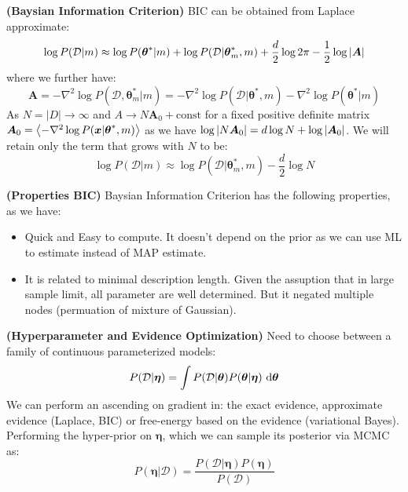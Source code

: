 \begin{definition}{\textbf{(Baysian Information Criterion)}}
    BIC can be obtained from Laplace approximate:
    \begin{equation*}
        \log P(\mathcal{D} | m) \approx \log P(\boldsymbol \theta^* | m) + \log P(\mathcal{D}|\boldsymbol \theta^*_m, m) + \frac{d}{2}\log 2\pi - \frac{1}{2}\log\left| \boldsymbol A \right|
    \end{equation*}
    where we further have:
    \begin{equation*}
        \boldsymbol A = -\nabla^2\log P(\mathcal{D}, \boldsymbol \theta^*_m | m) = -\nabla^2\log P(\mathcal{D}|\boldsymbol \theta^*, m) -\nabla^2\log P(\boldsymbol \theta^*|m)
    \end{equation*}
    As $N=|D|\rightarrow\infty$ and $A\rightarrow N\boldsymbol A_0 + \text{const}$ for a fixed positive definite matrix $\boldsymbol A_0 = \left\langle -\nabla^2\log P(\boldsymbol x | \boldsymbol \theta^*, m) \right\rangle$ as we have $\log\left| N\boldsymbol A_0 \right| = d\log N + \log\left| \boldsymbol A_0 \right|$. We will retain only the term that grows with $N$ to be:
    \begin{equation*}
        \log P(\mathcal{D} | m) \approx \log P(\mathcal{D}|\boldsymbol \theta^*_m, m) - \frac{d}{2}\log N
    \end{equation*}
\end{definition}

\begin{remark}{\textbf{(Properties BIC)}}
    Baysian Information Criterion has the following properties, as we have:
    \begin{itemize}
        \item Quick and Easy to compute. It doesn't depend on the prior as we can use ML to estimate instead of MAP estimate. 
        \item It is related to minimal description length. Given the assuption that in large sample limit, all parameter are well determined. But it negated multiple nodes (permuation of mixture of Gaussian).
    \end{itemize}
\end{remark}

\begin{definition}{\textbf{(Hyperparameter and Evidence Optimization)}}
    Need to choose between a family of continuous parameterized models:
    \begin{equation*}
        P(\mathcal{D} | \boldsymbol \eta) = \int P(\mathcal{D} | \boldsymbol \theta)P(\boldsymbol \theta | \boldsymbol \eta) \ \mathrm{d} \boldsymbol \theta
    \end{equation*}
    We can perform an ascending on gradient in: the exact evidence, approximate evidence (Laplace, BIC) or free-energy based on the evidence (variational Bayes). Performing the hyper-prior on $\boldsymbol \eta$, which we can sample its posterior via MCMC as:
    \begin{equation*}
        P(\boldsymbol \eta | \mathcal{D}) = \frac{P(\mathcal{D}|\boldsymbol \eta)P(\boldsymbol \eta)}{P(\mathcal{D})}
    \end{equation*}
\end{definition}

